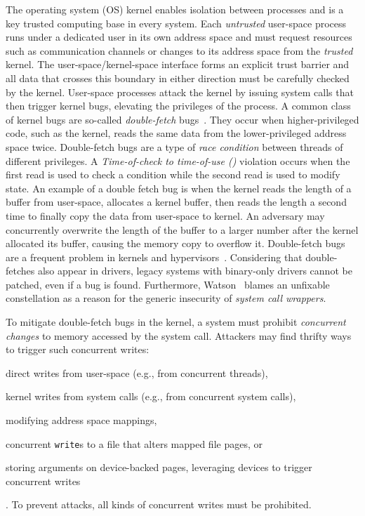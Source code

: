 \documentclass[letterpaper,twocolumn,10pt, anonymous]{article}
\begin{document}
The operating system (OS) kernel enables isolation between processes and is 
a key trusted computing
base in every system. Each \emph{untrusted} user-space process runs under a
dedicated user in its own address space and must request resources such as
communication channels or changes to its address space from the \emph{trusted}
kernel. The user-space/kernel-space interface forms an explicit trust barrier
and all data that crosses this boundary in either direction must be carefully 
checked by the kernel.
%
User-space processes attack the kernel by issuing system calls that then trigger
kernel bugs, elevating the privileges of the process.
%
A common class of kernel bugs are so-called \emph{double-fetch}
bugs~\cite{serna08doublefetch, twizsgrakky07ring0, wilhelm2016xenpwn,
wang2018survey}. They occur when higher-privileged code, such as
the kernel, reads the same data from the lower-privileged address space twice.
%
Double-fetch bugs are a type of
\emph{race condition} between threads of different privileges. A
\emph{Time-of-check to time-of-use (\tocttou)} violation occurs when the first
read is used to check a condition while the second read is used to modify
state.
%
An example of a double fetch bug is when the kernel reads the length of a buffer
from user-space, allocates a kernel buffer, then reads the length a second time
to finally copy the data from user-space to kernel. An adversary may concurrently
overwrite the length of the buffer to a larger number after the kernel allocated
its buffer, causing the memory copy to overflow it.
%
Double-fetch bugs are a frequent problem in kernels and
hypervisors~\cite{cve201812633, cve202012652, cve20131332, cve201920610,
cve20158550, cve201610439, cve201610435, cve201610433, cve20195519,
cve20168438}. Considering that double-fetches also appear in drivers, legacy
systems with binary-only drivers cannot be patched, even if a bug is found.
Furthermore, Watson~\cite{watson2007exploiting} blames an unfixable \tocttou
constellation as a reason for the generic insecurity of \emph{system call
wrappers}.


To mitigate double-fetch bugs in the kernel, a system must prohibit
\emph{concurrent changes} to memory accessed by the system call. Attackers may
find thrifty ways to trigger such concurrent writes:
\begin{inparaenum}
\item  direct writes from user-space (e.g., from concurrent threads),
\item  kernel writes from system calls (e.g., from concurrent system calls),
\item  modifying address space mappings,
\item  concurrent \texttt{write}s to a file that alters mapped
file pages, or
\item  storing arguments on device-backed pages, leveraging devices to trigger
concurrent writes
\end{inparaenum}.
To prevent attacks, all kinds of concurrent writes must be prohibited.
\end{document}
